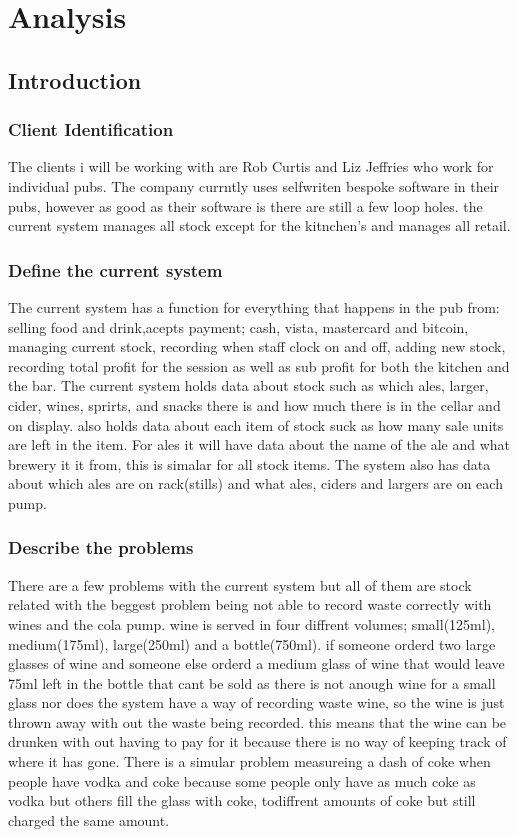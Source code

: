\chapter{Analysis}

\section{Introduction}

\subsection{Client Identification}
The clients i will be working with are Rob Curtis and Liz Jeffries who work for individual pubs. The company currntly uses selfwriten bespoke software in their pubs, however as good as their software is there are still a few loop holes. the current system manages all stock except for the kitnchen's and manages all retail. 

\subsection{Define the current system}

The current system has a function for everything that happens in the pub from: selling food and drink,acepts payment; cash, vista, mastercard and bitcoin, managing current stock, recording when staff clock on and off, adding new stock, recording total profit for the session as well as sub profit for both the kitchen and the bar. The current system holds data about stock such as which ales, larger, cider, wines, sprirts, and snacks there is and how much there is in the cellar and on display. also holds data about each item of stock suck as how many sale units are left in the item. For ales it will have data about the name of the ale and what brewery it it from, this is simalar for all stock items. The system also has data about which ales are on rack(stills) and what ales, ciders and largers are on each pump.

\subsection{Describe the problems}

There are a few problems with the current system but all of them are stock related with the beggest problem being not able to record waste correctly with wines and the cola pump. wine is served in four diffrent volumes; small(125ml), medium(175ml), large(250ml) and a bottle(750ml). if someone orderd two large glasses of wine and someone else orderd a medium glass of wine that would leave 75ml left in the bottle that cant be sold as there is not anough wine for a small glass nor does the system have a way of recording waste wine, so the wine is just thrown away with out the waste being recorded. this means that the wine can be drunken with out having to pay for it because there is no way of keeping track of where it has gone. There is a simular problem measureing a dash of coke when people have vodka and coke because some people only have as much coke as vodka but others fill the glass with coke, todiffrent amounts of coke but still charged the same amount.

